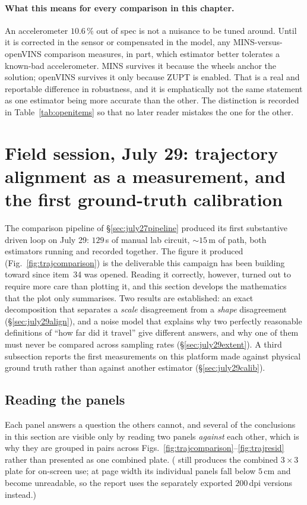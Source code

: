 \paragraph{What this means for every comparison in this chapter.}
An accelerometer $10.6\,\%$ out of spec is not a nuisance to be tuned around.
Until it is corrected in the sensor or compensated in the model, any
MINS-versus-openVINS comparison measures, in part, which estimator better
tolerates a known-bad accelerometer. MINS survives it because the wheels
anchor the solution; openVINS survives it only because ZUPT is enabled. That
is a real and reportable difference in robustness, and it is emphatically not
the same statement as one estimator being more accurate than the other. The
distinction is recorded in Table~\ref{tab:openitems} so that no later reader
mistakes the one for the other.

\section{Field session, July 29: trajectory alignment as a measurement, and
the first ground-truth calibration}
\label{sec:july29}
The comparison pipeline of \S\ref{sec:july27pipeline} produced its first
substantive driven loop on July 29: $129$\,s of manual lab circuit,
$\sim15$\,m of path, both estimators running and recorded together. The
figure it produced (Fig.~\ref{fig:trajcomparison}) is the deliverable this
campaign has been building toward since item~34 was opened. Reading it
correctly, however, turned out to require more care than plotting it, and
this section develops the mathematics that the plot only summarises. Two
results are established: an exact decomposition that separates a
\emph{scale} disagreement from a \emph{shape} disagreement
(\S\ref{sec:july29align}), and a noise model that explains why two perfectly
reasonable definitions of ``how far did it travel'' give different answers,
and why one of them must never be compared across sampling rates
(\S\ref{sec:july29extent}). A third subsection reports the first
measurements on this platform made against physical ground truth rather than
against another estimator (\S\ref{sec:july29calib}).

\subsection{Reading the panels}
\label{sec:july29panels}
Each panel answers a question the others cannot, and several of the
conclusions in this section are visible only by reading two panels
\emph{against} each other, which is why they are grouped in pairs across
Figs.~\ref{fig:trajcomparison}--\ref{fig:trajresid} rather than presented as
one combined plate. ( still produces the combined
$3\times3$ plate for on-screen use; at page width its individual panels fall
below $5$\,cm and become unreadable, so the report uses the separately
exported $200$\,dpi versions instead.)

